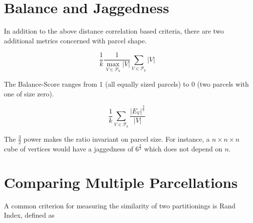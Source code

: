\section{Balance and Jaggedness}

In addition to the above distance correlation based criteria, there are
two additional metrics concerned with parcel shape.

\begin{definition}[Balance] \label{balance}
\[ \frac{1}{k} \frac{1}{\max_{V \in \mathcal{P}_k} |V|}
   \sum_{V \in \mathcal{P}_k} |V| \]
\end{definition}

The Balance-Score ranges from 1 (all equally sized parcels) to
0 (two parcels with one of size zero).

\begin{definition}[Jaggedness] \label{jaggedness}
\[ \frac{1}{k} \sum_{V \in \mathcal{P}_k} \frac{|E_V|^\frac{3}{2}}{|V|}
\]
\end{definition}

The $\frac{3}{2}$ power makes the ratio invariant on parcel size.
For instance, a $n \times n \times n$ cube of vertices would have
a jaggedness of $6^{\frac{3}{2}}$ which does not depend on $n$.

\section{Comparing Multiple Parcellations}

A common criterion for measuring the similarity of two partitionings
is Rand Index, defined as
